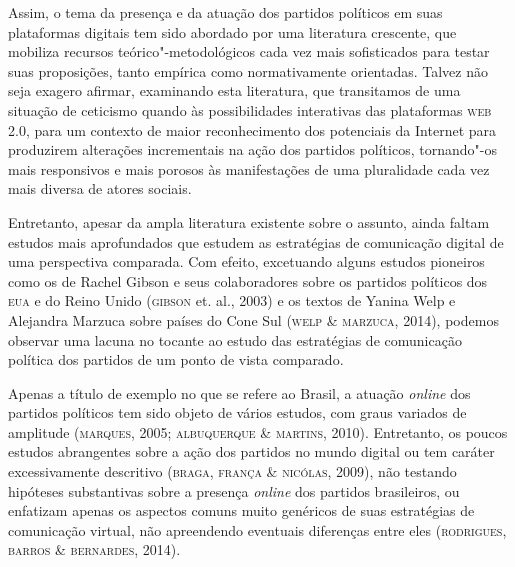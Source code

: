 Assim, o tema da presença e da atuação dos partidos políticos em suas
plataformas digitais tem sido abordado por uma literatura crescente, que
mobiliza recursos teórico"-metodológicos cada vez mais sofisticados para
testar suas proposições, tanto empírica como normativamente orientadas.
Talvez não seja exagero afirmar, examinando esta literatura, que
transitamos de uma situação de ceticismo quando às possibilidades
interativas das plataformas \textsc{web 2.0}, para um contexto de maior
reconhecimento dos potenciais da Internet para produzirem alterações
incrementais na ação dos partidos políticos, tornando"-os mais
responsivos e mais porosos às manifestações de uma pluralidade cada vez
mais diversa de atores sociais.

Entretanto, apesar da ampla literatura existente sobre o assunto, ainda
faltam estudos mais aprofundados que estudem as estratégias de
comunicação digital de uma perspectiva comparada. Com efeito, excetuando
alguns estudos pioneiros como os de Rachel Gibson e seus colaboradores
sobre os partidos políticos dos \textsc{eua} e do Reino Unido (\textsc{gibson} et. al.,
2003) e os textos de Yanina Welp e Alejandra Marzuca sobre países do
Cone Sul (\textsc{welp \& marzuca}, 2014), podemos observar uma lacuna no tocante
ao estudo das estratégias de comunicação política dos partidos de um
ponto de vista comparado. 

Apenas a título de exemplo no que se refere ao
Brasil, a atuação \emph{online} dos partidos políticos tem sido objeto de vários
estudos, com graus variados de amplitude (\textsc{marques}, 2005; \textsc{albuquerque} \&
\textsc{martins}, 2010). Entretanto, os poucos estudos abrangentes sobre a ação
dos partidos no mundo digital ou tem caráter excessivamente descritivo
(\textsc{braga}, \textsc{frança \& nicólas}, 2009), não testando hipóteses substantivas
sobre a presença \emph{online} dos partidos brasileiros, ou enfatizam apenas os
aspectos comuns muito genéricos de suas estratégias de comunicação
virtual, não apreendendo eventuais diferenças entre eles (\textsc{rodrigues},
\textsc{barros \& bernardes}, 2014).

